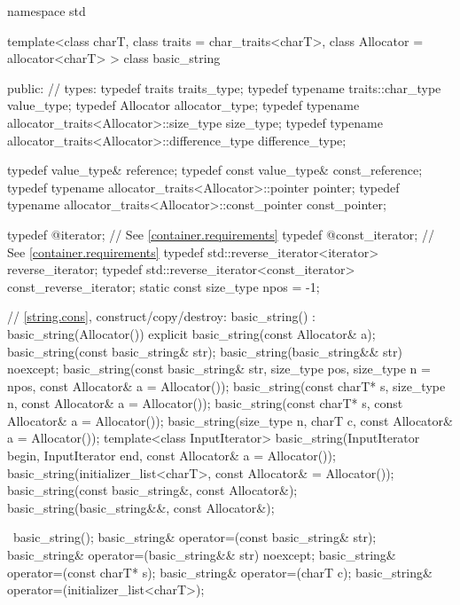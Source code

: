 %
\begin{codeblock}
namespace std {
  template<class charT, class traits = char_traits<charT>,
    class Allocator = allocator<charT> >
  class basic_string {
  public:
    // types:
    typedef          traits                                         traits_type;
    typedef typename traits::char_type                              value_type;
    typedef          Allocator                                      allocator_type;
    typedef typename allocator_traits<Allocator>::size_type         size_type;
    typedef typename allocator_traits<Allocator>::difference_type   difference_type;

    typedef value_type& reference;
    typedef const value_type&   const_reference;
    typedef typename allocator_traits<Allocator>::pointer           pointer;
    typedef typename allocator_traits<Allocator>::const_pointer     const_pointer;

    typedef @\impdef@              iterator;       // See \ref{container.requirements}
    typedef @\impdef@              const_iterator; // See \ref{container.requirements}
    typedef std::reverse_iterator<iterator> reverse_iterator;
    typedef std::reverse_iterator<const_iterator> const_reverse_iterator;
    static const size_type npos = -1;

    // \ref{string.cons}, construct/copy/destroy:
    basic_string() : basic_string(Allocator()) { }
    explicit basic_string(const Allocator& a);
    basic_string(const basic_string& str);
    basic_string(basic_string&& str) noexcept;
    basic_string(const basic_string& str, size_type pos, size_type n = npos,
                 const Allocator& a = Allocator());
    basic_string(const charT* s,
                 size_type n, const Allocator& a = Allocator());
    basic_string(const charT* s, const Allocator& a = Allocator());
    basic_string(size_type n, charT c, const Allocator& a = Allocator());
    template<class InputIterator>
      basic_string(InputIterator begin, InputIterator end,
                   const Allocator& a = Allocator());
    basic_string(initializer_list<charT>, const Allocator& = Allocator());
    basic_string(const basic_string&, const Allocator&);
    basic_string(basic_string&&, const Allocator&);

   ~basic_string();
    basic_string& operator=(const basic_string& str);
    basic_string& operator=(basic_string&& str) noexcept;
    basic_string& operator=(const charT* s);
    basic_string& operator=(charT c);
    basic_string& operator=(initializer_list<charT>);

}}
\end{codeblock}
